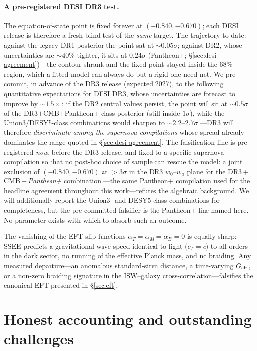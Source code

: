 \documentclass[a4paper,11pt]{article}
\begin{document}
\paragraph{A pre-registered DESI DR3 test.} The equation-of-state point is
fixed forever at $(-0.840,-0.670)$; each DESI release is therefore a fresh
blind test of the \emph{same} target. The trajectory to date: against the legacy DR1 posterior the
point sat at ${\sim}0.05\sigma$; against DR2,
whose uncertainties are ${\sim}40\%$ tighter, it sits at $0.24\sigma$
(Pantheon+; \S\ref{sec:desi-agreement})---the contour shrank and the fixed
point stayed inside the $68\%$ region, which a fitted model can always do but
a rigid one need not. We pre-commit, in advance of the DR3 release (expected
2027), to the following quantitative expectations for
DESI DR3, whose uncertainties are forecast to improve by ${\sim}1.5\times$:
if the DR2 central values persist, the point will sit at ${\sim}0.5\sigma$ of
the DR3$+$CMB$+$Pantheon+-class posterior (still inside $1\sigma$), while the
Union3/DESY5-class combinations would sharpen to ${\sim}2.2$--$2.7\sigma$
---DR3 will therefore \emph{discriminate among the supernova compilations}
whose spread already dominates the range quoted in \S\ref{sec:desi-agreement}.
The falsification line is pre-registered \emph{now}, before the DR3 release, and
fixed to a specific supernova compilation so that no post-hoc choice of sample can
rescue the model: a joint exclusion of $(-0.840,-0.670)$ at ${>}3\sigma$ in the
DR3 $w_0$--$w_a$ plane for the DR3\,$+$\,CMB\,$+$\,\emph{Pantheon+} combination
---the same Pantheon+ compilation used for the headline agreement throughout this
work---refutes the algebraic background. We will additionally report the
Union3- and DESY5-class combinations for completeness, but the pre-committed
falsifier is the Pantheon+ line named here. No parameter exists with which
to absorb such an outcome.

The vanishing of the EFT slip functions $\alpha_T=\alpha_M=\alpha_B=0$ is
equally sharp: SSEE predicts a gravitational-wave speed identical to light
($c_T=c$) to all orders in the dark sector, no running of the effective Planck
mass, and no braiding. Any measured departure---an anomalous standard-siren
distance, a time-varying $G_{\rm eff}$, or a non-zero braiding signature in the
ISW--galaxy cross-correlation---falsifies the canonical EFT presented in
\S\ref{sec:eft}.

\section{Honest accounting and outstanding challenges}
\label{sec:open}
\end{document}

